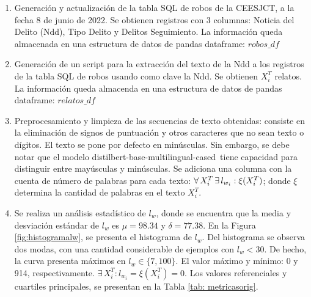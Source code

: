 \documentclass[onecolumn, journal, english, 12pt, a4paper]{IEEEtran} %
\newcommand{\modelohuggingface}{distilbert-base-multilingual-cased}
\theoremstyle{definition}
\begin{document}
\begin{enumerate}
    \item Generación y actualización de la tabla SQL de robos de la CEESJCT, a la fecha 8 de junio de 2022. Se obtienen  registros con 3 columnas: Noticia del Delito (Ndd), Tipo Delito y Delitos Seguimiento. La información queda almacenada en una estructura de datos de pandas dataframe: $robos\_df$
    \item Generación de un script para la extracción del texto de la Ndd a los registros de la tabla SQL de robos usando como clave la Ndd. Se obtienen  $X^T_i$ relatos. La información queda almacenda en una estructura de datos de pandas dataframe: $relatos\_df$
    \item Preprocesamiento y limpieza de las secuencias de texto obtenidas: consiste en la eliminación de signos de puntuación y otros caracteres que no sean texto o dígitos. El texto se pone por defecto en minúsculas. Sin embargo, se debe notar que el modelo \modelohuggingface\, tiene capacidad para distinguir entre mayúsculas y minúsculas. Se adiciona una columna con la cuenta de número de palabras para cada texto: $\forall \thinspace X^T_i \thinspace \exists \thinspace l_{w_{i}}: \xi(X^T_i)$; donde $\xi$ determina la cantidad de palabras en el texto $X^T_i$.
    
    \item Se realiza un análisis estadístico de $l_w$, donde se encuentra que la media  y  desviación estándar de $l_w$ es $\mu = 98.34$ y $\delta=77.38$. En la Figura \ref{fig:histogramalw}, se presenta el histograma de $l_w$. Del histograma se observa dos modas, con una cantidad considerable de ejemplos con $l_w< 30$. De hecho, la curva presenta máximos en $l_w \in \{7, 100\}$. El valor máximo y mínimo: 0 y 914, respectivamente. $\exists \, X^T_i:l_{w_{i}} = \xi(X^T_i)=0$. Los valores referenciales y cuartiles principales, se presentan en la Tabla \ref{tab: metricasorig}.


\end{enumerate}
\end{document}
